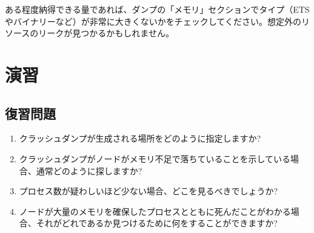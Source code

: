 ある程度納得できる量であれば、ダンプの「メモリ」セクションでタイプ（ETSやバイナリーなど）が非常に大きくないかをチェックしてください。想定外のリソースのリークが見つかるかもしれません。

\section{演習}

\subsection*{復習問題}

\begin{enumerate}
	\item クラッシュダンプが生成される場所をどのように指定しますか?
	\item クラッシュダンプがノードがメモリ不足で落ちていることを示している場合、通常どのように探しますか?
	\item プロセス数が疑わしいほど少ない場合、どこを見るべきでしょうか?
	\item ノードが大量のメモリを確保したプロセスとともに死んだことがわかる場合、それがどれであるか見つけるために何をすることができますか?\end{enumerate}

